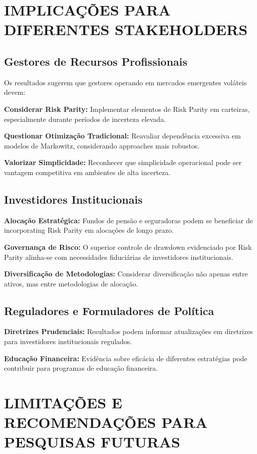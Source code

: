 \section{IMPLICAÇÕES PARA DIFERENTES STAKEHOLDERS}

\subsection{Gestores de Recursos Profissionais}

Os resultados sugerem que gestores operando em mercados emergentes voláteis devem:

\textbf{Considerar Risk Parity:} Implementar elementos de Risk Parity em carteiras, especialmente durante períodos de incerteza elevada.

\textbf{Questionar Otimização Tradicional:} Reavaliar dependência excessiva em modelos de Markowitz, considerando approaches mais robustos.

\textbf{Valorizar Simplicidade:} Reconhecer que simplicidade operacional pode ser vantagem competitiva em ambientes de alta incerteza.

\subsection{Investidores Institucionais}

\textbf{Alocação Estratégica:} Fundos de pensão e seguradoras podem se beneficiar de incorporating Risk Parity em alocações de longo prazo.

\textbf{Governança de Risco:} O superior controle de drawdown evidenciado por Risk Parity alinha-se com necessidades fiduciárias de investidores institucionais.

\textbf{Diversificação de Metodologias:} Considerar diversificação não apenas entre ativos, mas entre metodologias de alocação.

\subsection{Reguladores e Formuladores de Política}

\textbf{Diretrizes Prudenciais:} Resultados podem informar atualizações em diretrizes para investidores institucionais regulados.

\textbf{Educação Financeira:} Evidência sobre eficácia de diferentes estratégias pode contribuir para programas de educação financeira.

\section{LIMITAÇÕES E RECOMENDAÇÕES PARA PESQUISAS FUTURAS}


